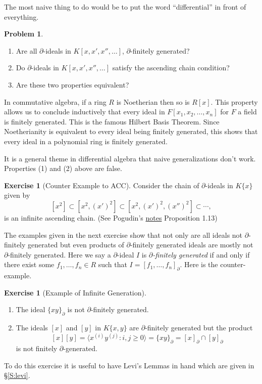 \documentclass[12pt]{book}
\numberwithin{equation}{section}
\theoremstyle{definition}
\newtheorem{problem}[theorem]{Problem}
\newtheorem{exercise}[theorem]{Exercise}
\theoremstyle{remark}
\begin{document}
The most naive thing to do would be to put the word ``differential'' in front of everything. 
\begin{problem}
	\begin{enumerate}
		\item Are all $\partial$-ideals in $K[x,x',x'',\ldots]$, $\partial$-finitely generated?
		\item Do $\partial$-ideals in $K[x,x',x'',\ldots]$ satisfy the ascending chain condition?
		\item Are these two properties equivalent?
	\end{enumerate}
\end{problem}
In commutative algebra, if a ring $R$ is Noetherian then so is $R[x]$. 
This property allows us to conclude inductively that every ideal in $F[x_1,x_2,\ldots,x_n]$ for $F$ a field is finitely generated. 
This is the famous Hilbert Basis Theorem.
Since Noetherianity is equivalent to every ideal being finitely generated, this shows that every ideal in a polynomial ring is finitely generated. 

It is a general theme in differential algebra that naive generalizations don't work. 
Properties (1) and (2) above are false. 
\begin{exercise}[Counter Example to ACC]
	Consider the chain of $\partial$-ideals in $K\lbrace x \rbrace$ given by 
	$$ [x^2]  \subset [x^2, (x')^2] \subset [ x^2, (x')^2, (x'')^2 ] \subset \cdots, $$
	is an infinite ascending chain. (See Pogudin's \href{http://www.lix.polytechnique.fr/Labo/Gleb.POGUDIN/files/da_notes.pdf}{notes} Proposition 1.13)
\end{exercise}

The examples given in the next exercise show that not only are all ideals not $\partial$-finitely generated but even products of $\partial$-finitely generated ideals are mostly not $\partial$-finitely generated.
Here we say a $\partial$-ideal $I$ is \emph{$\partial$-finitely generated} if and only if there exist some $f_1,\ldots,f_n \in R$ such that $I=[f_1,\ldots,f_n]_{\partial}$.
Here is the counter-example.
\begin{exercise}[Example of Infinite Generation]
	\begin{enumerate}
		\item The ideal $\lbrace x y\rbrace_{\partial}$ is not $\partial$-finitely generated.
		\item The ideals $[x]$ and $[y]$ in $K\lbrace x,y\rbrace$ are $\partial$-finitely generated but the product
		$$[x][y] = \langle x^{(i)}y^{(j)} \colon i,j \geq 0 \rangle = \lbrace xy \rbrace_{\partial} = [x]_{\partial} \cap [y]_{\partial}$$ 
		is not finitely $\partial$-generated.
	\end{enumerate}
\end{exercise}
To do this exercise it is useful to have Levi's Lemmas in hand which are given in \S\ref{S:levi}.
\end{document}
